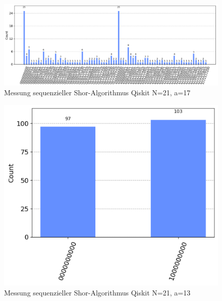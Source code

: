 \documentclass[a4paper,journal]{IEEEtran}
\begin{document}
\clearpage
\begin{figure}[p]
\caption{Messung sequenzieller Shor-Algorithmus Qiskit N=21, a=17}
\label{fig:shor_countsN21a17}
\includegraphics[height=\linewidth,angle=90]{shor_countsN21a17.PNG}
\end{figure}
\begin{figure}[p]
\caption{Messung sequenzieller Shor-Algorithmus Qiskit N=21, a=13}
\label{fig:shor_countsN21a13}
\includegraphics[height=\linewidth,angle=90]{shor_countsN21a13.PNG}
\end{figure}
\clearpage


\end{document}
